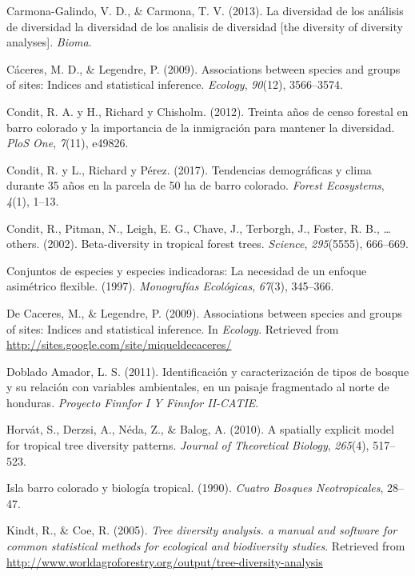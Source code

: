\documentclass[11pt,]{article}
\begin{document}
\hypertarget{ref-carmona2013diversidad}{}
Carmona-Galindo, V. D., \& Carmona, T. V. (2013). La diversidad de los
análisis de diversidad la diversidad de los analisis de diversidad
{[}the diversity of diversity analyses{]}. \emph{Bioma}.

\hypertarget{ref-caceres2009associations}{}
Cáceres, M. D., \& Legendre, P. (2009). Associations between species and
groups of sites: Indices and statistical inference. \emph{Ecology},
\emph{90}(12), 3566--3574.

\hypertarget{ref-condit2012thirty}{}
Condit, R. A. y H., Richard y Chisholm. (2012). Treinta años de censo
forestal en barro colorado y la importancia de la inmigración para
mantener la diversidad. \emph{PloS One}, \emph{7}(11), e49826.

\hypertarget{ref-condit2017demographic}{}
Condit, R. y L., Richard y Pérez. (2017). Tendencias demográficas y
clima durante 35 años en la parcela de 50 ha de barro colorado.
\emph{Forest Ecosystems}, \emph{4}(1), 1--13.

\hypertarget{ref-condit2002beta}{}
Condit, R., Pitman, N., Leigh, E. G., Chave, J., Terborgh, J., Foster,
R. B., \ldots{} others. (2002). Beta-diversity in tropical forest trees.
\emph{Science}, \emph{295}(5555), 666--669.

\hypertarget{ref-dufrene1997species}{}
Conjuntos de especies y especies indicadoras: La necesidad de un enfoque
asimétrico flexible. (1997). \emph{Monografías Ecológicas},
\emph{67}(3), 345--366.

\hypertarget{ref-indicspecies}{}
De Caceres, M., \& Legendre, P. (2009). Associations between species and
groups of sites: Indices and statistical inference. In \emph{Ecology}.
Retrieved from \url{http://sites.google.com/site/miqueldecaceres/}

\hypertarget{ref-doblado2011identificacion}{}
Doblado Amador, L. S. (2011). Identificación y caracterización de tipos
de bosque y su relación con variables ambientales, en un paisaje
fragmentado al norte de honduras. \emph{Proyecto Finnfor I Y Finnfor
II-CATIE}.

\hypertarget{ref-horvat2010spatially}{}
Horvát, S., Derzsi, A., Néda, Z., \& Balog, A. (2010). A spatially
explicit model for tropical tree diversity patterns. \emph{Journal of
Theoretical Biology}, \emph{265}(4), 517--523.

\hypertarget{ref-leigh1990barro}{}
Isla barro colorado y biología tropical. (1990). \emph{Cuatro Bosques
Neotropicales}, 28--47.

\hypertarget{ref-diversityanalysis}{}
Kindt, R., \& Coe, R. (2005). \emph{Tree diversity analysis. a manual
and software for common statistical methods for ecological and
biodiversity studies}. Retrieved from
\url{http://www.worldagroforestry.org/output/tree-diversity-analysis}
\end{document}
